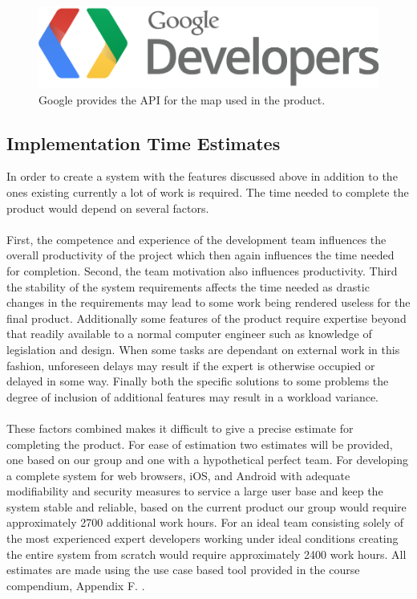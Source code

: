 \begin{figure}[ht!]
  \centering
  \includegraphics[width=\linewidth]{./FurtherWork/img/GoogleDevelopersLogo}
  \caption{Google provides the API for the map used in the product.}
  \label{fig:FurtherGoogleDevelopersLogo}
\end{figure}

\subsection{Implementation Time Estimates}
\label{subsec:FurtherRequiredEstimate}

In order to create a system with the features discussed above in addition to the ones existing currently a lot of work is required. The time needed to complete the product would depend on several factors. 
\paragraph{} First, the competence and experience of the development team influences the overall productivity of the project which then again influences the time needed for completion. Second, the team motivation also influences productivity. Third the stability of the system requirements affects the time needed as drastic changes in the requirements may lead to some work being rendered useless for the final product. Additionally some features of the product require expertise beyond that readily available to a normal computer engineer such as knowledge of legislation and design. When some tasks are dependant on external work in this fashion, unforeseen delays may result if the expert is otherwise occupied or delayed in some way. Finally both the specific solutions to some problems the degree of inclusion of additional features may result in a workload variance. 
\paragraph{} These factors combined makes it difficult to give a precise estimate for completing the product. For ease of estimation two estimates will be provided, one based on our group and one with a hypothetical perfect team. For developing a complete system for web browsers, iOS, and Android with adequate modifiability and security measures to service a large user base and keep the system stable and reliable, based on the current product our group would require approximately 2700 additional work hours. For an ideal team consisting solely of the most experienced expert developers working under ideal conditions creating the entire system from scratch would require approximately 2400 work hours. All estimates are made using the use case based tool provided in the course compendium, Appendix F. \cite{booklet:CDPCompendium}.
